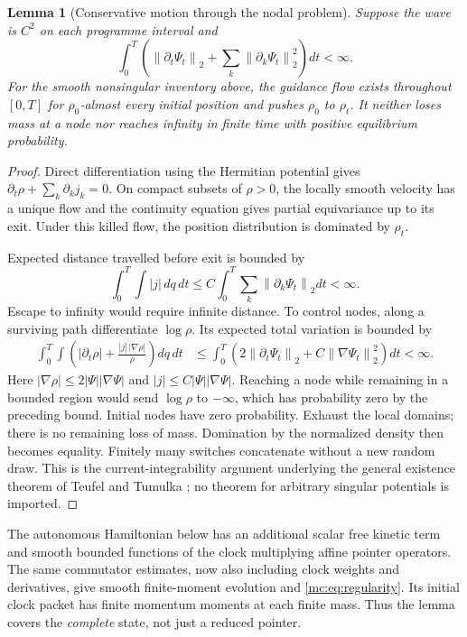 \documentclass[11pt,oneside,openany]{book}
\newtheorem{lemma}[theorem]{Lemma}
\theoremstyle{definition}
\theoremstyle{remark}\newtheorem{remark}[theorem]{Remark}
\providecommand{\norm}[1]{\left\lVert#1\right\rVert}
\begin{document}
\begin{lemma}[Conservative motion through the nodal problem]\label{mc:lem:exist}
Suppose the wave is $C^2$ on each programme interval and
\begin{equation}\label{mc:eq:regularity}
 \int_0^T\left(\norm{\partial_t\Psi_t}_2+
       \sum_k\norm{\partial_k\Psi_t}_2^2\right)dt<\infty.
\end{equation}
For the smooth nonsingular inventory above, the guidance flow exists throughout $[0,T]$ for $\rho_0$-almost every initial position and pushes $\rho_0$ to $\rho_t$. It neither loses mass at a node nor reaches infinity in finite time with positive equilibrium probability.
\end{lemma}
\begin{proof}
Direct differentiation using the Hermitian potential gives $\partial_t\rho+\sum_k\partial_kj_k=0$. On compact subsets of $\rho>0$, the locally smooth velocity has a unique flow and the continuity equation gives partial equivariance up to its exit. Under this killed flow, the position distribution is dominated by $\rho_t$.

Expected distance travelled before exit is bounded by
\[
 \int_0^T\!\int |j|\,dq\,dt
 \le C\int_0^T\sum_k\norm{\partial_k\Psi_t}_2dt<\infty.
\]
Escape to infinity would require infinite distance. To control nodes, along a surviving path differentiate $\log\rho$. Its expected total variation is bounded by
\begin{align*}
 \int_0^T\!\int\left(|\partial_t\rho|
       +\frac{|j|\,|\nabla\rho|}{\rho}\right)dq\,dt
 &\le\int_0^T\left(2\norm{\partial_t\Psi_t}_2
                  +C\norm{\nabla\Psi_t}_2^2\right)dt<\infty.
\end{align*}
Here $|\nabla\rho|\le2|\Psi||\nabla\Psi|$ and $|j|\le C|\Psi||\nabla\Psi|$. Reaching a node while remaining in a bounded region would send $\log\rho$ to $-\infty$, which has probability zero by the preceding bound. Initial nodes have zero probability. Exhaust the local domains; there is no remaining loss of mass. Domination by the normalized density then becomes equality. Finitely many switches concatenate without a new random draw. This is the current-integrability argument underlying the general existence theorem of Teufel and Tumulka \cite{mc:TT}; no theorem for arbitrary singular potentials is imported.
\end{proof}
The autonomous Hamiltonian below has an additional scalar free kinetic term and smooth bounded functions of the clock multiplying affine pointer operators. The same commutator estimates, now also including clock weights and derivatives, give smooth finite-moment evolution and \eqref{mc:eq:regularity}. Its initial clock packet has finite momentum moments at each finite mass. Thus the lemma covers the \emph{complete} state, not just a reduced pointer.
\end{document}

